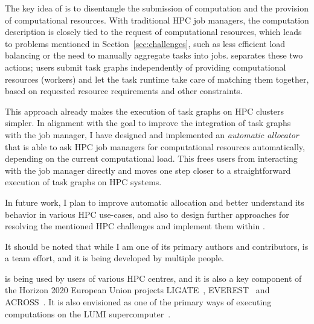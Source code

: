 The key idea of \hyperqueue{} is to disentangle the submission of computation and the provision of
computational resources. With traditional HPC job managers, the computation description is
closely tied to the request of computational resources, which leads to problems mentioned in
Section~\ref{sec:challenges}, such as less efficient load balancing or the need to manually
aggregate tasks into jobs. \hyperqueue{} separates these two actions; users submit task graphs
independently of providing computational resources (workers) and let the task runtime take care of
matching them together, based on requested resource requirements and other constraints.

This approach already makes the execution of task graphs on HPC clusters simpler. In alignment
with the goal to improve the integration of task graphs with the job manager, I have designed
and implemented an \emph{automatic allocator} that is able to ask HPC job managers for
computational resources automatically, depending on the current computational load. This frees
users from interacting with the job manager directly and moves one step closer to a straightforward
execution of task graphs on HPC systems.

In future work, I plan to improve automatic allocation and better understand its behavior in
various
HPC use-cases, and also to design further approaches for resolving the mentioned HPC challenges
and implement them within \hyperqueue{}.

It should be noted that while I am one of its primary authors and contributors, \hyperqueue{}
is a team effort, and it is being developed by multiple people.

\hyperqueue{} is being used by users of various HPC centres, and it is also a key
component of the Horizon 2020 European Union projects
LIGATE~,
EVEREST~ and
ACROSS~. It is also envisioned as one of the primary ways of
executing computations on the LUMI supercomputer~\cite{lumi_it4innovations_2022}.

